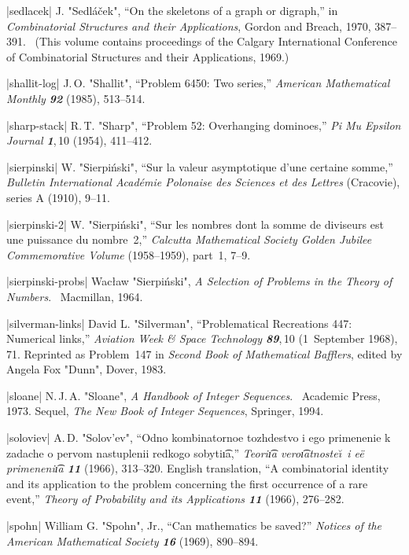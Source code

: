 \bib|sedlacek|%
J. "Sedl\'a\v cek", ``On the skeletons of a graph or digraph,''
in {\sl Combinatorial Structures and their Applications}, Gordon and
Breach, 1970, 387--391.
\ (This volume contains
proceedings of the Calgary International Conference of Combinatorial
Structures and their Applications, 1969.)

\bib|shallit-log|%
J.\,O. "Shallit", ``Problem 6450: Two series,'' {\sl American
Mathematical Monthly\/ \bf92} (1985), 513--514.

\bib|sharp-stack|%
R.\,T. "Sharp", ``Problem 52: Overhanging dominoes,''
{\sl Pi Mu Epsilon Journal\/ \bf1},\,10 (1954), 411--412.

\bib|sierpinski|%
W. "Sierpi\'nski", ``Sur la valeur asymptotique d'une certaine somme,''
{\sl Bulletin International Acad\'emie Polonaise des Sciences et des
Lettres\/} (Cracovie), series A (1910), 9--11.

\bib|sierpinski-2|%
W. "Sierpi\'nski", ``Sur les nombres dont la somme de diviseurs est
une puissance du nombre~2,'' {\sl Calcutta Mathematical Society
Golden Jubilee Commemorative Volume\/} (1958--1959), part~1, 7--9.

\bib|sierpinski-probs|%
Wac\l aw "Sierpi\'nski", {\sl A Selection of Problems in the Theory
of Numbers}. \ Macmillan, 1964.

\bib|silverman-links|%
David L. "Silverman", ``Problematical Recreations 447: Numerical links,''
{\sl Aviation Week \& Space Technology\/ \bf89},\,10 (1~September 1968), 71.
Reprinted as Problem~147 in {\sl Second Book of Mathematical
Bafflers}, edited by Angela Fox "Dunn", Dover, 1983.


\bib|sloane|%
N.\,J.\,A. "Sloane", {\sl A Handbook of Integer Sequences}. \
Academic Press, 1973. Sequel, {\sl The New Book of Integer Sequences},
Springer, 1994.

\bib|soloviev|%
A.\,D. "Solov'ev", ``Odno kombinatornoe tozhdestvo i ego primenenie
k zadache o pervom nastuplenii redkogo sobyti\t\i a,''
{\sl Teori\t\i a vero\t\i atnoste\u\i\ i e\"e primeneni\t\i a\/ \bf11}
(1966), 313--320. English translation, ``A combinatorial identity
and its application to the problem concerning the first occurrence of
a rare event,'' {\sl Theory of Probability and its Applications\/ \bf11}
(1966), 276--282.

\bib|spohn|%
William G. "Spohn", Jr., ``Can mathematics be saved?''
{\sl Notices of the American Mathematical Society\/ \bf16} (1969),
890--894.

